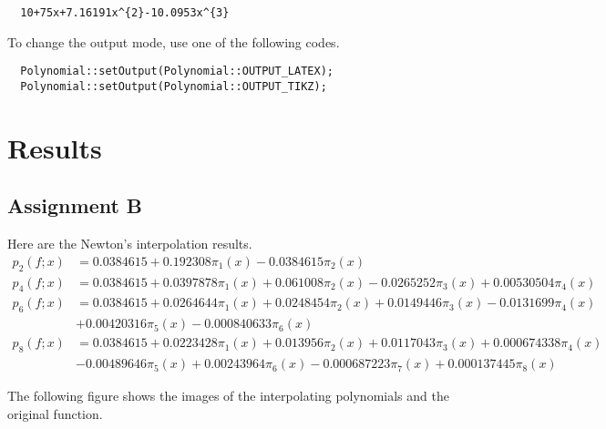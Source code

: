 \documentclass[11pt,en]{elegantpaper}
\begin{document}
\begin{lstlisting}
  10+75x+7.16191x^{2}-10.0953x^{3}
\end{lstlisting}

To change the output mode, use one of the following codes.

\begin{lstlisting}
  Polynomial::setOutput(Polynomial::OUTPUT_LATEX);
  Polynomial::setOutput(Polynomial::OUTPUT_TIKZ);
\end{lstlisting}

\section{Results}

\subsection{Assignment B}

Here are the Newton's interpolation results.
\begin{align*}
  p_2(f;x) &= 0.0384615+0.192308\pi_{1}(x)-0.0384615\pi_{2}(x)\\
  p_4(f;x) &= 0.0384615+0.0397878\pi_{1}(x)+0.061008\pi_{2}(x)-0.0265252\pi_{3}(x)+0.00530504\pi_{4}(x)\\
  p_6(f;x) &= 0.0384615+0.0264644\pi_{1}(x)+0.0248454\pi_{2}(x)+0.0149446\pi_{3}(x)-0.0131699\pi_{4}(x)\\
           &  +0.00420316\pi_{5}(x)-0.000840633\pi_{6}(x)\\
  p_8(f;x) &= 0.0384615+0.0223428\pi_{1}(x)+0.013956\pi_{2}(x)+0.0117043\pi_{3}(x)+0.000674338\pi_{4}(x)\\
           &  -0.00489646\pi_{5}(x)+0.00243964\pi_{6}(x)-0.000687223\pi_{7}(x)+0.000137445\pi_{8}(x)
\end{align*}

The following figure shows the images of the interpolating polynomials and the original function.

\end{document}
